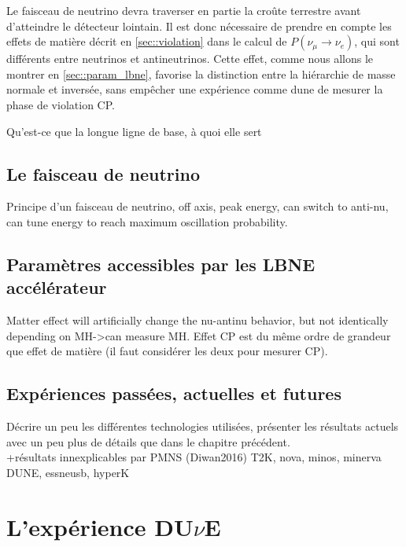             Le faisceau de neutrino devra traverser en partie la croûte terrestre avant d'atteindre le détecteur lointain. Il est donc nécessaire de prendre en compte les effets de matière décrit en \autoref{sec::violation} dans le calcul de $P(\nu_{\mu}\to \nu_e)$, qui sont différents entre neutrinos et antineutrinos. Cette effet, comme nous allons le montrer en \autoref{sec::param_lbne}, favorise la distinction entre la hiérarchie de masse normale et inversée, sans empêcher une expérience comme \gls{dune} de mesurer la phase de violation CP.
            
            Qu'est-ce que la longue ligne de base, à quoi elle sert\\
            
        \subsection{Le faisceau de neutrino}\label{sec::faisceau}
            Principe d'un faisceau de neutrino, off axis, peak energy, can switch to anti-nu, can tune energy to reach maximum oscillation probability.
            
        \subsection{Paramètres accessibles par les LBNE accélérateur}\label{sec::param_lbne}
                
             Matter effect will artificially change the nu-antinu behavior, but not identically depending on MH->can measure MH. Effet CP est du même ordre de grandeur que effet de matière (il faut considérer les deux pour mesurer CP).
             
        \subsection{Expériences passées, actuelles et futures}
            Décrire un peu les différentes technologies utilisées, présenter les résultats actuels avec un peu plus de détails que dans le chapitre précédent.\\
            +résultats innexplicables par PMNS (Diwan2016)
            T2K, nova, minos, minerva
            \cite{Diwan2016}\\
            DUNE, essneusb, hyperK
            
        
    \section{L'expérience \texorpdfstring{DU$\nu$E}{DUNE}}
    
